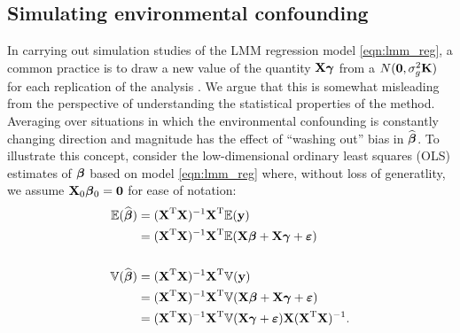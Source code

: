 \subsection{Simulating environmental confounding}
\label{sec:sim_env_conf}


In carrying out simulation studies of the LMM regression model \eqref{eqn:lmm_reg}, a common practice is to draw a new value of the quantity $\textbf{X}\boldsymbol{\gamma}$ from a $N(\boldsymbol{0}, \sigma^2_g \textbf{K})$ for each replication of the analysis \citep{Rakitsch2012, bhatnagar2019simultaneous}.  We argue that this is somewhat misleading from the perspective of understanding the statistical properties of the method. Averaging over situations in which the environmental confounding is constantly changing direction and magnitude has the effect of ``washing out'' bias in $\widehat{\boldsymbol{\beta}{}}$. To illustrate this concept, consider the low-dimensional ordinary least squares (OLS) estimates of $\boldsymbol{\beta}{}$ based on model \eqref{eqn:lmm_reg} where, without loss of generatlity, we assume $\textbf{X}_0 \boldsymbol{\beta}{}_0 = \boldsymbol{0}$ for ease of notation: 
\begin{align}
    \mathbb{E}(\widehat{\boldsymbol{\beta}{}}) &= (\textbf{X}^{\text{T}} \textbf{X})^{-1} \textbf{X}^{\text{T}} \mathbb{E}(\textbf{y}) \notag \\
    &=  (\textbf{X}^{\text{T}} \textbf{X})^{-1} \textbf{X}^{\text{T}} \mathbb{E}(\textbf{X}\boldsymbol{\beta}{} + \textbf{X}\boldsymbol{\gamma} + \boldsymbol{\varepsilon}{}) \label{eqn:expectation}\\
    &\quad \notag\\
    \mathbb{V}(\widehat{\boldsymbol{\beta}{}}) &= (\textbf{X}^{\text{T}} \textbf{X})^{-1} \textbf{X}^{\text{T}} \mathbb{V}(\textbf{y}) \notag\\
    &=  (\textbf{X}^{\text{T}} \textbf{X})^{-1} \textbf{X}^{\text{T}} \mathbb{V}(\textbf{X}\boldsymbol{\beta}{} + \textbf{X}\boldsymbol{\gamma} + \boldsymbol{\varepsilon}{}) \notag\\
    &=  (\textbf{X}^{\text{T}} \textbf{X})^{-1} \textbf{X}^{\text{T}} \mathbb{V}(\textbf{X}\boldsymbol{\gamma} + \boldsymbol{\varepsilon}{}) \textbf{X}  (\textbf{X}^{\text{T}} \textbf{X})^{-1} \label{eqn:variance}.
\end{align}
